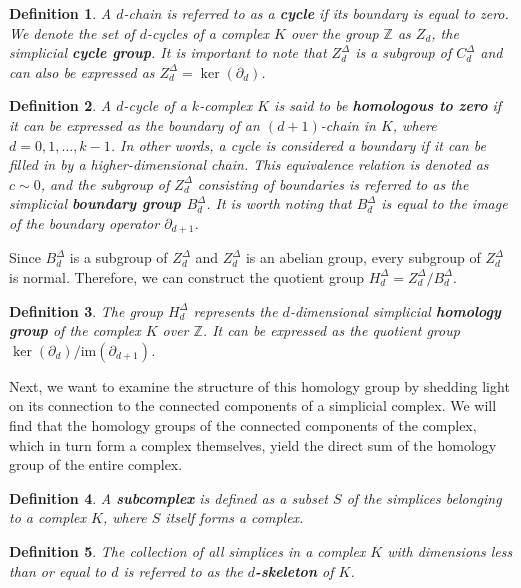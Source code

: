 \documentclass{amsart}
\newtheorem{definition}{Definition}[section]
\begin{document}
\begin{definition}
A $d$-chain is referred to as a \textbf{cycle} if its boundary is equal to zero. We denote the set of $d$-cycles of a complex $K$ over the group $\mathbb{Z}$ as $Z_d$, the simplicial \textbf{cycle group}. It is important to note that $Z^\Delta_d$ is a subgroup of $C^\Delta_d$ and can also be expressed as $Z^\Delta_d = \ker(\partial_d)$.
\end{definition}

\begin{definition}
A $d$-cycle of a $k$-complex $K$ is said to be \textbf{homologous to zero} if it can be expressed as the boundary of an $(d+1)$-chain in $K$, where $d=0,1,\ldots,k-1$. In other words, a cycle is considered a boundary if it can be \glqq filled in\grqq{} by a higher-dimensional chain. This equivalence relation is denoted as $c \sim 0$, and the subgroup of $Z^\Delta_d$ consisting of boundaries is referred to as the simplicial \textbf{boundary group $B^\Delta_d$}. It is worth noting that $B^\Delta_d$ is equal to the image of the boundary operator $\partial_{d+1}$.
\end{definition}

Since $B^\Delta_d$ is a subgroup of $Z^\Delta_d$ and $Z^\Delta_d$ is an abelian group, every subgroup of $Z^\Delta_d$ is normal. Therefore, we can construct the quotient group $H^\Delta_d = Z^\Delta_d / B^\Delta_d$.

\begin{definition}
The group $H^\Delta_d$ represents the $d$-dimensional simplicial \textbf{homology group} of the complex $K$ over $\mathbb{Z}$. It can be expressed as the quotient group $\ker(\partial_d) / \text{im}(\partial_{d+1})$.
\end{definition}

Next, we want to examine the structure of this homology group by shedding light on its connection to the connected components of a simplicial complex. We will find that the homology groups of the connected components of the complex, which in turn form a complex themselves, yield the direct sum of the homology group of the entire complex.

\begin{definition}
A \textbf{subcomplex} is defined as a subset $S$ of the simplices belonging to a complex $K$, where $S$ itself forms a complex.
\end{definition}

\begin{definition}
The collection of all simplices in a complex $K$ with dimensions less than or equal to $d$ is referred to as the \textbf{$d$-skeleton} of $K$.
\end{definition}
\end{document}
